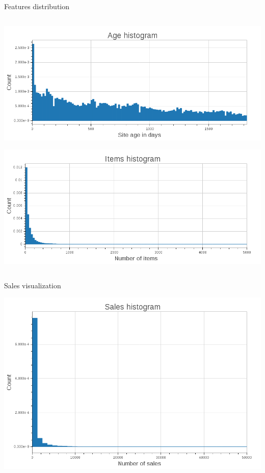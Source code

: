 \begin{frame}[fragile]{Features distribution}
\begin{columns}
     \begin{column}{.49\textwidth}
        \begin{center}
            \includegraphics[scale=.18]{images/histogram_age}
        \end{center}
        \newline{}
        \begin{center}
            \includegraphics[scale=.18]{images/histogram_items}
        \end{center}
     \end{column}
    \end{columns}

\end{frame}


\begin{frame}[fragile]{Sales visualization}
    \begin{center}
        \includegraphics[scale=.25]{images/histogram_sales}
    \end{center}
\end{frame}


